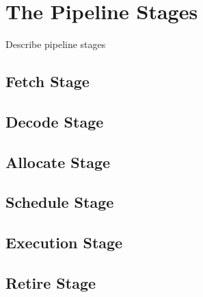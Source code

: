 
\clearpage
\section{The Pipeline Stages}

Describe pipeline stages

\subsection{Fetch Stage}

\subsection{Decode Stage}

\subsection{Allocate Stage}

\subsection{Schedule Stage}

\subsection{Execution Stage}

\subsection{Retire Stage}
